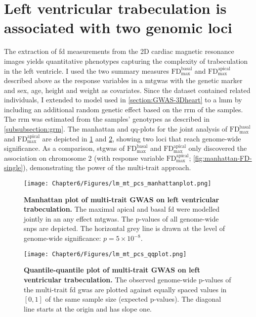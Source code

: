 \section{Left ventricular trabeculation is associated with two genomic loci}
The extraction of \gls{fd} measurements from the 2D cardiac magnetic resonance images yields quantitative phenotypes capturing the complexity of trabeculation in the left ventricle. I used the two summary measures \(\text{FD}_\text{max}^\text{basal}\) and \(\text{FD}_\text{max}^\text{apical}\) described above as the response variables in a \gls{mtgwas} with the genetic marker and sex, age, height and weight as covariates. Since the dataset contained related individuals, I extended to model used in \cref{section:GWAS-3Dheart} to a \gls{lmm} by including an additional random genetic effect based on the \gls{rrm} of the samples. The \gls{rrm} was estimated from the samples' genotypes as described in \cref{subsubsection:grm}. The manhattan and qq-plots for the joint analysis of \(\text{FD}_\text{max}^\text{basal}\) and \(\text{FD}_\text{max}^\text{apical}\) are depicted in \cref{fig:manhattan-FD} and \cref{fig:qq-FD}, showing two loci that reach genome-wide significance. As a comparison, \gls{stgwas} of  \(\text{FD}_\text{max}^\text{basal}\) and \(\text{FD}_\text{max}^\text{apical}\) only discovered the association on chromosome 2 (with response variable \(\text{FD}_\text{max}^\text{apical}\); \cref{fig:manhattan-FD-single}), demonstrating the power of the multi-trait approach.
%
\begin{figure}[hbtp]
	\centering
	\texttt{[image: Chapter6/Figures/lm\_mt\_pcs\_manhattanplot.png]}
	\caption[\textbf{Manhattan plot of multi-trait GWAS on left ventricular trabeculation. }]{\textbf{Manhattan plot of multi-trait GWAS on left ventricular trabeculation. } The maximal apical and basal \gls{fd} were modelled jointly in an any effect \gls{mtgwas}. The p-values of all genome-wide \glspl{snp} are depicted. The horizontal grey line is drawn at the level of genome-wide significance: \(p = 5 \times 10^{-8}\).} 
	 	\label{fig:manhattan-FD}
\end{figure}
%
\begin{figure}[hbtp]
	\centering
	\texttt{[image: Chapter6/Figures/lm\_mt\_pcs\_qqplot.png]}
	\caption[\textbf{Quantile-quantile plot of multi-trait GWAS on left ventricular trabeculation .}]{\textbf{Quantile-quantile plot of multi-trait GWAS on left ventricular trabeculation.} The observed genome-wide p-values of the multi-trait \gls{fd} \gls{gwas} are plotted against equally spaced values in \([0,1]\) of the same sample size (expected p-values). The diagonal line starts at the origin and has slope one.} 
	 	\label{fig:qq-FD}
\end{figure}
